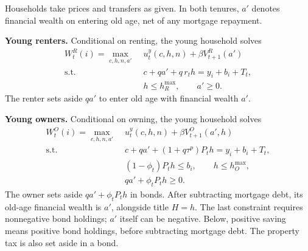 \documentclass[11pt]{article}
\begin{document}
Households take prices and transfers as given. In both tenures, $a'$ denotes
financial wealth on entering old age, net of any mortgage repayment.

\textbf{Young renters.}
Conditional on renting, the young household solves
\begin{align}
 W_t^R(i)=\max_{c,h,n,a'}\;&u_t^y(c,h,n)+\beta V_{t+1}^R(a') \nonumber\\
 \text{s.t.}\quad&
 c+qa'+q\,r_th=y_i+b_i+T_t,\nonumber\\[-2pt]
 &h\leq h_R^{\max},\qquad a'\geq0.
 \label{eq:amend_young_renter}
\end{align}
The renter sets aside $qa'$ to enter old age with financial wealth $a'$.

\textbf{Young owners.}
Conditional on owning, the young household solves
\begin{align}
 W_t^O(i)=\max_{c,h,n,a'}\;&u_t^y(c,h,n)+\beta V_{t+1}^O(a',h) \nonumber\\
 \text{s.t.}\quad&
 c+qa'+(1+q\tau^p)P_th=y_i+b_i+T_t,\nonumber\\[-2pt]
 &(1-\phi_t)P_th\leq b_i,\qquad h\leq h_O^{\max},\nonumber\\[-2pt]
 &qa'+\phi_tP_th\geq0.
 \label{eq:amend_young_owner}
\end{align}
The owner sets aside $qa'+\phi_tP_th$ in bonds. After subtracting mortgage
debt, its old-age financial wealth is $a'$, alongside title
$H=h$. The last constraint requires nonnegative bond holdings; $a'$ itself
can be negative. Below, positive saving means positive bond holdings,
before subtracting mortgage debt. The property tax is also set aside in a bond.
\end{document}
